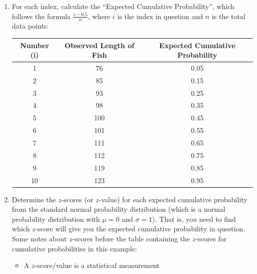 \documentclass[12pt]{article}
\begin{document}
\begin{itemize}
\begin{enumerate}
		      \item For each index, calculate the ``Expected Cumulative
		            Probability'', which follows the formula $\frac{i - 0.5}{n}$,
		            where $i$ is the index in question and $n$ is the total data
		            points:
		            \begin{center}
			            \begin{tabular}{c | c | c}
				            Number (i) & Observed Length of Fish & Expected Cumulative Probability \\
				            \hline
				            1          & 76                      & 0.05                            \\
				            2          & 85                      & 0.15                            \\
				            3          & 93                      & 0.25                            \\
				            4          & 98                      & 0.35                            \\
				            5          & 100                     & 0.45                            \\
				            6          & 101                     & 0.55                            \\
				            7          & 111                     & 0.65                            \\
				            8          & 112                     & 0.75                            \\
				            9          & 119                     & 0.85                            \\
				            10         & 123                     & 0.95
			            \end{tabular}
		            \end{center}
		      \item Determine the $z$-scores (or $z$-value) for each expected cumulative
		            probability from the standard normal probability
		            distribution (which is a normal probability distribution
		            with $\mu = 0$ and $\sigma = 1$). That is, you need to find which
		            $z$-score will give you the expected cumulative probability in question.
		            Some notes about $z$-scores before the table containing the
		            $z$-scores for cumulative probabilities in this example:
		            \begin{itemize}
			            \item A $z$-score/value is a statistical measurement

\end{itemize}
\end{enumerate}
\end{itemize}
\end{document}

